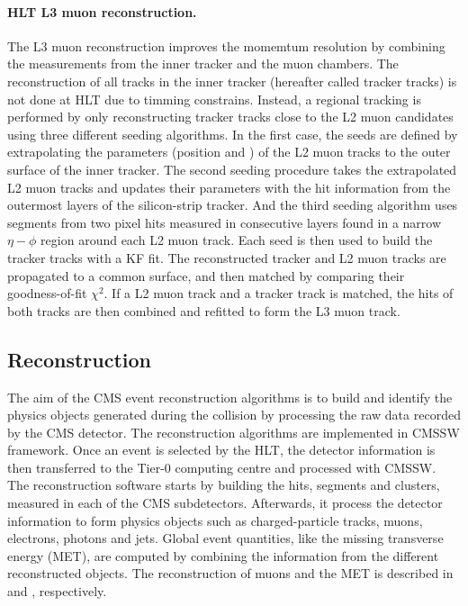 \paragraph{HLT L3 muon reconstruction.} The L3 muon reconstruction improves the momemtum resolution by combining the measurements from the inner tracker and the muon chambers. The reconstruction of all tracks in the inner tracker (hereafter called tracker tracks) is not done at HLT due to timming constrains. Instead, a regional tracking is performed by only reconstructing tracker tracks close to the L2 muon candidates using three different seeding algorithms. In the first case, the seeds are defined by extrapolating the parameters (position and \pt) of the L2 muon tracks to the outer surface of the inner tracker. The second seeding procedure takes the extrapolated L2 muon tracks and updates their parameters with the hit information from the outermost layers of the silicon-strip tracker. And the third seeding algorithm uses segments from two pixel hits measured in consecutive layers found in a narrow $\eta-\phi$ region around each L2 muon track. Each seed is then used to build the tracker tracks with a KF fit. The reconstructed tracker and L2 muon tracks are propagated to a common surface, and then matched by comparing their goodness-of-fit $\chi^{2}$. If a L2 muon track and a tracker track is matched, the hits of both tracks are then combined and refitted to form the L3 muon track.


\subsection{Reconstruction}

The aim of the CMS event reconstruction algorithms is to build and identify the physics objects generated during the collision by processing the raw data recorded by the CMS detector. The reconstruction algorithms are implemented in CMSSW framework. Once an event is selected by the HLT, the detector information is then transferred to the Tier-0 computing centre and processed with CMSSW. The reconstruction software starts by building the hits, segments and clusters, measured in each of the CMS subdetectors. Afterwards, it process the detector information to form physics objects such as charged-particle tracks, muons, electrons, photons and jets. Global event quantities, like the missing transverse energy (MET), are computed by combining the information from the different reconstructed objects. The reconstruction of muons and the MET is described in  and , respectively.


